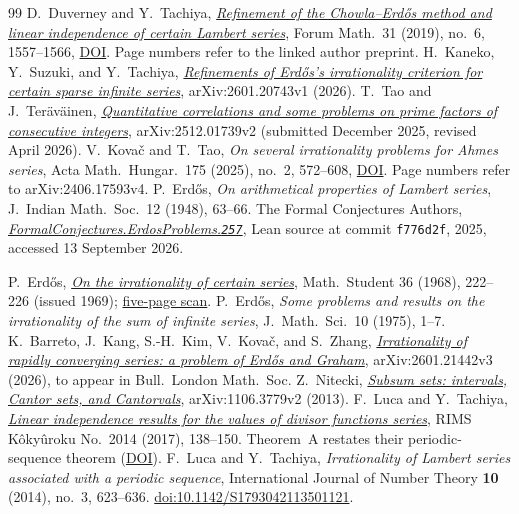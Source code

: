 \documentclass[11pt]{article}
\begin{document}
\begingroup\small
\begin{thebibliography}{99}
 D.~Duverney and Y.~Tachiya,
  \href{https://danielduverney.fr/documents/theorie-des-nombres/DuverneyTachiya190522.pdf}
  {\emph{Refinement of the Chowla--Erd\H{o}s method and linear independence
  of certain Lambert series}},
  Forum Math.\ 31 (2019), no.~6, 1557--1566,
  \href{https://doi.org/10.1515/forum-2018-0299}{DOI}.  Page numbers refer to
  the linked author preprint.
 H.~Kaneko, Y.~Suzuki, and Y.~Tachiya,
  \href{https://arxiv.org/abs/2601.20743v1}{\emph{Refinements of Erd\H{o}s's
  irrationality criterion for certain sparse infinite series}},
  arXiv:2601.20743v1 (2026).
 T.~Tao and J.~Ter\"av\"ainen,
  \href{https://arxiv.org/abs/2512.01739v2}{\emph{Quantitative correlations and
  some problems on prime factors of consecutive integers}}, arXiv:2512.01739v2
  (submitted December 2025, revised April 2026).
 V.~Kova\v{c} and T.~Tao, \emph{On several irrationality
  problems for Ahmes series}, Acta Math.\ Hungar.\ 175 (2025), no.~2, 572--608,
  \href{https://doi.org/10.1007/s10474-025-01528-0}{DOI}.  Page numbers refer
  to arXiv:2406.17593v4.
 P.~Erd\H{o}s, \emph{On arithmetical properties of Lambert
  series}, J.~Indian Math.\ Soc.\ 12 (1948), 63--66.
 The Formal Conjectures Authors,
  \href{https://github.com/google-deepmind/formal-conjectures/blob/f776d2f2039351b00737ffcafb9d7d7666e1d9af/FormalConjectures/ErdosProblems/257.lean}
  {\emph{FormalConjectures.ErdosProblems.\texttt{257}}},
  Lean source at commit \texttt{f776d2f}, 2025, accessed 13 September 2026.

 P.~Erd\H{o}s,
  \href{https://users.renyi.hu/~p_erdos/1969-09.pdf}{\emph{On the
  irrationality of certain series}}, Math.\ Student 36 (1968), 222--226
  (issued 1969); \href{https://www.renyi.hu/~p_erdos/1969-09.pdf}{five-page scan}.
 P.~Erd\H{o}s, \emph{Some problems and results on the
  irrationality of the sum of infinite series}, J.~Math.\ Sci.\ 10 (1975),
  1--7.
 K.~Barreto, J.~Kang, S.-H.~Kim, V.~Kova\v{c}, and
  S.~Zhang, \href{https://arxiv.org/abs/2601.21442v3}{\emph{Irrationality of
  rapidly converging series: a problem of Erd\H{o}s and Graham}},
  arXiv:2601.21442v3 (2026), to appear in Bull.\ London Math.\ Soc.
 Z.~Nitecki,
  \href{https://arxiv.org/abs/1106.3779v2}{\emph{Subsum sets: intervals, Cantor
  sets, and Cantorvals}}, arXiv:1106.3779v2 (2013).
 F.~Luca and Y.~Tachiya,
  \href{https://www.kurims.kyoto-u.ac.jp/~kyodo/kokyuroku/contents/pdf/2014-14.pdf}
  {\emph{Linear independence results for the values of divisor functions
  series}}, RIMS K\^oky\^uroku No.~2014 (2017), 138--150.
  Theorem~A restates their periodic-sequence theorem
  (\href{https://doi.org/10.1142/S1793042113501121}{DOI}).
F.~Luca and Y.~Tachiya,
\emph{Irrationality of Lambert series associated with a periodic sequence},
International Journal of Number Theory \textbf{10} (2014), no.~3, 623--636.
\href{https://doi.org/10.1142/S1793042113501121}{doi:10.1142/S1793042113501121}.


\end{thebibliography}
\end{document}
